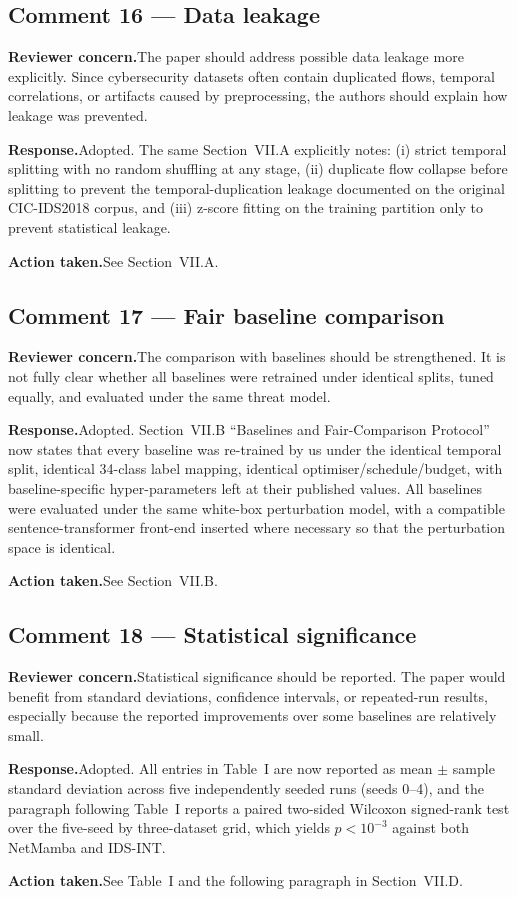 \documentclass[11pt,a4paper]{article}
\newcommand{\concern}[1]{\noindent\textbf{Reviewer concern.}\quad #1\par\vspace{0.3em}}
\newcommand{\response}[1]{\noindent\textbf{Response.}\quad #1\par\vspace{0.3em}}
\newcommand{\action}[1]{\noindent\textbf{Action taken.}\quad #1\par\vspace{0.8em}}
\begin{document}
\subsection*{Comment 16 --- Data leakage}
\concern{The paper should address possible data leakage more explicitly. Since cybersecurity datasets often contain duplicated flows, temporal correlations, or artifacts caused by preprocessing, the authors should explain how leakage was prevented.}
\response{Adopted. The same Section~VII.A explicitly notes: (i) strict temporal splitting with no random shuffling at any stage, (ii) duplicate flow collapse before splitting to prevent the temporal-duplication leakage documented on the original CIC-IDS2018 corpus, and (iii) z-score fitting on the training partition only to prevent statistical leakage.}
\action{See Section~VII.A.}

\subsection*{Comment 17 --- Fair baseline comparison}
\concern{The comparison with baselines should be strengthened. It is not fully clear whether all baselines were retrained under identical splits, tuned equally, and evaluated under the same threat model.}
\response{Adopted. Section~VII.B ``Baselines and Fair-Comparison Protocol'' now states that every baseline was re-trained by us under the identical temporal split, identical 34-class label mapping, identical optimiser/schedule/budget, with baseline-specific hyper-parameters left at their published values. All baselines were evaluated under the same white-box perturbation model, with a compatible sentence-transformer front-end inserted where necessary so that the perturbation space is identical.}
\action{See Section~VII.B.}

\subsection*{Comment 18 --- Statistical significance}
\concern{Statistical significance should be reported. The paper would benefit from standard deviations, confidence intervals, or repeated-run results, especially because the reported improvements over some baselines are relatively small.}
\response{Adopted. All entries in Table~I are now reported as mean $\pm$ sample standard deviation across five independently seeded runs (seeds 0--4), and the paragraph following Table~I reports a paired two-sided Wilcoxon signed-rank test over the five-seed by three-dataset grid, which yields $p<10^{-3}$ against both NetMamba and IDS-INT.}
\action{See Table~I and the following paragraph in Section~VII.D.}
\end{document}
